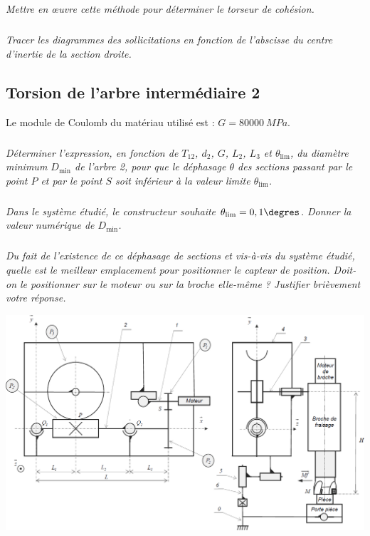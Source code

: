 \documentclass[10pt,fleqn]{article} %
\begin{document}
\begin{multicols}{2}
\subparagraph{}\textit{Mettre en \oe{}uvre cette méthode pour déterminer le torseur de cohésion.}

\subparagraph{}\textit{Tracer les diagrammes des sollicitations en fonction de l'abscisse du centre d'inertie de la section droite.}

\subsection*{Torsion de l’arbre intermédiaire 2}

Le module de Coulomb du matériau utilisé est : $G = \SI{80000}{MPa}$.

\subparagraph{}\textit{Déterminer l’expression, en fonction de $T_{12}$, $d_2$, $G$, $L_2$, $L_3$ et $\theta_{\text{lim}}$, du diamètre minimum $D_{\text{min}}$ de l’arbre 2, pour que le déphasage $\theta$ des sections passant par le point
$P$ et par le point $S$ soit inférieur à la valeur limite $\theta_{\text{lim}}$.}

\subparagraph{}\textit{Dans le système étudié, le constructeur souhaite $\theta_{\text{lim}}=0,1\degres$. Donner la valeur
numérique de $D_{\text{min}}$.}

\subparagraph{}\textit{Du fait de l’existence de ce déphasage de sections et vis-à-vis du système étudié, quelle
est le meilleur emplacement pour positionner le capteur de position. Doit-on le positionner
sur le moteur ou sur la broche elle-même ? Justifier brièvement votre réponse.}


\end{multicols}


\begin{center}
\includegraphics[width=\linewidth]{images/fig_02}
\end{center}
\end{document}
